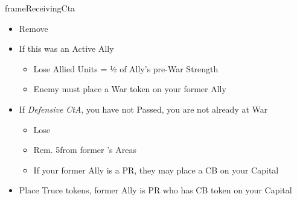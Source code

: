 \documentclass[10pt]{article}
\newlength{\fhReceivingCta} \setlength\fhReceivingCta{\calc{17\baselineskip}}
\begin{document}
\begin{dynamiccontents*}{frameReceivingCta}
\begin{eubox}{\fhReceivingCta}
\begin{multicols}{2}
\begin{itemize}
			\item Remove \alliance
			\item If this was an Active Ally
			\begin{itemize}
				\item Lose Allied Units = ½ of Ally's pre-War Strength
				\item Enemy must place a War token on your former Ally
			\end{itemize}
			\item If \emph{Defensive CtA},  you have not Passed,  you are not already at War
			\begin{itemize}
				\item Lose 
				\item Rem. 5\influence from former \ally's Areas
				\item If your former Ally is a PR, they may place a CB on your Capital
			\end{itemize}
			\item Place Truce tokens,  former Ally is PR who has CB token on your Capital
		\end{itemize}
	\end{multicols}
\end{eubox}\end{dynamiccontents*}
\end{document}
